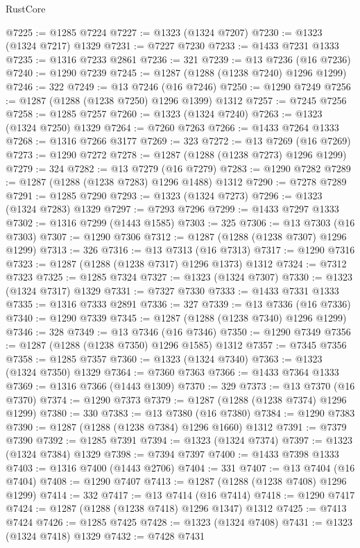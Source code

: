 \begin{lexlean}{RustCore}
\begin{coremodule}
@7225 := @1285 @7224
@7227 := @1323 (@1324 @7207)
@7230 := @1323 (@1324 @7217) @1329
@7231 := @7227 @7230
@7233 := @1433 @7231 @1333
@7235 := @1316 @7233 @2861
@7236 := 321
@7239 := @13 @7236 (@16 @7236)
@7240 := @1290 @7239
@7245 := @1287 (@1288 (@1238 @7240) @1296 @1299)
@7246 := 322
@7249 := @13 @7246 (@16 @7246)
@7250 := @1290 @7249
@7256 := @1287 (@1288 (@1238 @7250) @1296 @1399) @1312
@7257 := @7245 @7256
@7258 := @1285 @7257
@7260 := @1323 (@1324 @7240)
@7263 := @1323 (@1324 @7250) @1329
@7264 := @7260 @7263
@7266 := @1433 @7264 @1333
@7268 := @1316 @7266 @3177
@7269 := 323
@7272 := @13 @7269 (@16 @7269)
@7273 := @1290 @7272
@7278 := @1287 (@1288 (@1238 @7273) @1296 @1299)
@7279 := 324
@7282 := @13 @7279 (@16 @7279)
@7283 := @1290 @7282
@7289 := @1287 (@1288 (@1238 @7283) @1296 @1488) @1312
@7290 := @7278 @7289
@7291 := @1285 @7290
@7293 := @1323 (@1324 @7273)
@7296 := @1323 (@1324 @7283) @1329
@7297 := @7293 @7296
@7299 := @1433 @7297 @1333
@7302 := @1316 @7299 (@1443 @1585)
@7303 := 325
@7306 := @13 @7303 (@16 @7303)
@7307 := @1290 @7306
@7312 := @1287 (@1288 (@1238 @7307) @1296 @1299)
@7313 := 326
@7316 := @13 @7313 (@16 @7313)
@7317 := @1290 @7316
@7323 := @1287 (@1288 (@1238 @7317) @1296 @1373) @1312
@7324 := @7312 @7323
@7325 := @1285 @7324
@7327 := @1323 (@1324 @7307)
@7330 := @1323 (@1324 @7317) @1329
@7331 := @7327 @7330
@7333 := @1433 @7331 @1333
@7335 := @1316 @7333 @2891
@7336 := 327
@7339 := @13 @7336 (@16 @7336)
@7340 := @1290 @7339
@7345 := @1287 (@1288 (@1238 @7340) @1296 @1299)
@7346 := 328
@7349 := @13 @7346 (@16 @7346)
@7350 := @1290 @7349
@7356 := @1287 (@1288 (@1238 @7350) @1296 @1585) @1312
@7357 := @7345 @7356
@7358 := @1285 @7357
@7360 := @1323 (@1324 @7340)
@7363 := @1323 (@1324 @7350) @1329
@7364 := @7360 @7363
@7366 := @1433 @7364 @1333
@7369 := @1316 @7366 (@1443 @1309)
@7370 := 329
@7373 := @13 @7370 (@16 @7370)
@7374 := @1290 @7373
@7379 := @1287 (@1288 (@1238 @7374) @1296 @1299)
@7380 := 330
@7383 := @13 @7380 (@16 @7380)
@7384 := @1290 @7383
@7390 := @1287 (@1288 (@1238 @7384) @1296 @1660) @1312
@7391 := @7379 @7390
@7392 := @1285 @7391
@7394 := @1323 (@1324 @7374)
@7397 := @1323 (@1324 @7384) @1329
@7398 := @7394 @7397
@7400 := @1433 @7398 @1333
@7403 := @1316 @7400 (@1443 @2706)
@7404 := 331
@7407 := @13 @7404 (@16 @7404)
@7408 := @1290 @7407
@7413 := @1287 (@1288 (@1238 @7408) @1296 @1299)
@7414 := 332
@7417 := @13 @7414 (@16 @7414)
@7418 := @1290 @7417
@7424 := @1287 (@1288 (@1238 @7418) @1296 @1347) @1312
@7425 := @7413 @7424
@7426 := @1285 @7425
@7428 := @1323 (@1324 @7408)
@7431 := @1323 (@1324 @7418) @1329
@7432 := @7428 @7431

\end{coremodule}
\end{lexlean}
